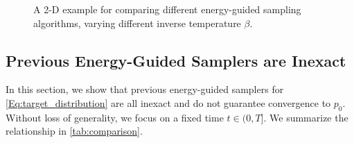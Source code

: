 \begin{figure}[ht]
\caption{
\small{A 2-D example for comparing different energy-guided sampling algorithms, varying different inverse temperature $\beta$.}
}
\label{fig:toy_main}
\end{figure}



\begin{table}[t]
    \vspace{-.1in}
    \centering
    \caption{\small{Comparison between energy-guided sampling algorithms.}}
    \vskip 0.1in
    \begin{small}
    \end{small}
    \label{tab:comparison}
    \vspace{-0.15in}
\end{table}






\subsection{Previous Energy-Guided Samplers are Inexact}
\label{sec:compare_energy}
In this section, we show that previous energy-guided samplers for \eqref{Eq:target_distribution} are all inexact and do not guarantee convergence to $p_0$. 
Without loss of generality, we focus on a fixed time $t\in(0,T]$. 
We summarize the relationship in \cref{tab:comparison}.


